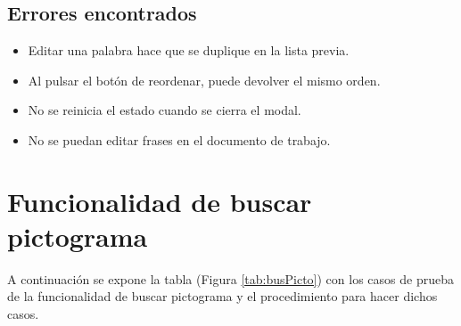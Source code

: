 \subsection{Errores encontrados}
\label{errores:v/f}
\begin{itemize}
    \item Editar una palabra hace que se duplique en la lista previa.
    \item Al pulsar el botón de reordenar, puede devolver el mismo orden.
    \item No se reinicia el estado cuando se cierra el modal.
    \item No se puedan editar frases en el documento de trabajo.
\end{itemize}

\section{Funcionalidad de buscar pictograma}
\label{planPruebas:busPicto}
A continuación se expone la tabla (Figura \ref{tab:busPicto}) con los casos de prueba de la funcionalidad de buscar pictograma y el procedimiento para hacer dichos casos.

\begin{table}[H]
    \caption{Casos de prueba de la funcionalidad de buscar pictograma.}
    \label{tab:busPicto}
\end{table}

